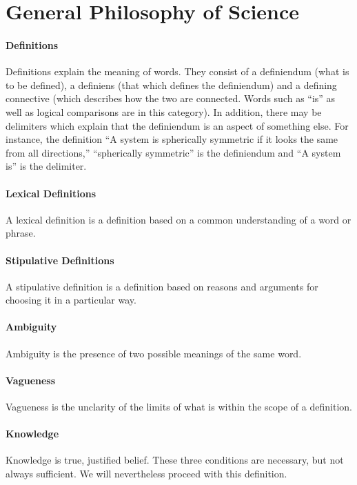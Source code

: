\section{General Philosophy of Science}

\paragraph{Definitions}
Definitions explain the meaning of words. They consist of a definiendum (what is to be defined), a definiens (that which defines the definiendum) and a defining connective (which describes how the two are connected. Words such as ``is'' as well as logical comparisons are in this category). In addition, there may be delimiters which explain that the definiendum is an aspect of something else. For instance, the definition ``A system is spherically symmetric if it looks the same from all directions,'' ``spherically symmetric'' is the definiendum and ``A system is'' is the delimiter.

\paragraph{Lexical Definitions}
A lexical definition is a definition based on a common understanding of a word or phrase.

\paragraph{Stipulative Definitions}
A stipulative definition is a definition based on reasons and arguments for choosing it in a particular way.

\paragraph{Ambiguity}
Ambiguity is the presence of two possible meanings of the same word.

\paragraph{Vagueness}
Vagueness is the unclarity of the limits of what is within the scope of a definition.

\paragraph{Knowledge}
Knowledge is true, justified belief. These three conditions are necessary, but not always sufficient. We will nevertheless proceed with this definition.

